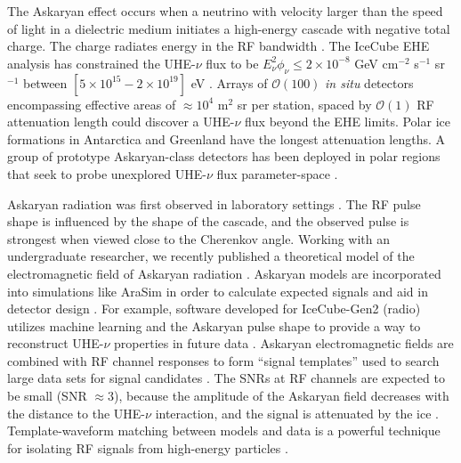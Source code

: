 \documentclass[../../main.tex]{subfiles}
\begin{document}
The Askaryan effect occurs when a neutrino with velocity larger than the speed of light in a dielectric medium initiates a high-energy cascade with negative total charge.  The charge radiates energy in the RF bandwidth \cite{askaryan1,zhs}.  The IceCube EHE analysis has constrained the UHE-$\nu$ flux to be $E_\nu^2 \phi_\nu \leq 2 \times 10^{-8}$ GeV cm$^{-2}$ s$^{-1}$ sr$^{-1}$ between $[5\times 10^{15} - 2\times 10^{19}]$ eV \cite{10.1103/physrevd.98.062003}.  Arrays of $\mathcal{O}(100)$ \textit{in situ} detectors encompassing effective areas of $\approx 10^4$ m$^2$ sr per station, spaced by $\mathcal{O}(1)$ RF attenuation length could discover a UHE-$\nu$ flux beyond the EHE limits.  Polar ice formations in Antarctica and Greenland have the longest attenuation lengths.  A group of prototype Askaryan-class detectors has been deployed in polar regions that seek to probe unexplored UHE-$\nu$ flux parameter-space \cite{rice,10.1088/1475-7516/2020/03/053,10.1103/physrevd.102.043021,10.1103/physrevd.99.122001}. \\ \vspace{2.5mm}

Askaryan radiation was first observed in laboratory settings \cite{saltzberg,10.1103/PhysRevD.74.043002,ask_ice}.  The RF pulse shape is influenced by the shape of the cascade, and the observed pulse is strongest when viewed close to the Cherenkov angle.  Working with an undergraduate researcher, we recently published a theoretical model of the electromagnetic field of Askaryan radiation \cite{PhysRevD.105.123019}. Askaryan models are incorporated into simulations like AraSim in order to calculate expected signals and aid in detector design \cite{dookayka2011characterizing,testbed,10.1140/epjc/s10052-020-7612-8}.  For example, software developed for IceCube-Gen2 (radio) utilizes machine learning and the Askaryan pulse shape to provide a way to reconstruct UHE-$\nu$ properties in future data \cite{10.1140/epjc/s10052-019-6971-5,10.1088/1748-0221/15/09/p09039,IFT}.  Askaryan electromagnetic fields are combined with RF channel responses to form ``signal templates'' used to search large data sets for signal candidates \cite{10.1088/1475-7516/2020/03/053,10.1016/j.astropartphys.2014.09.002}.  The SNRs at RF channels are expected to be small (SNR $\approx 3$), because the amplitude of the Askaryan field decreases with the distance to the UHE-$\nu$ interaction, and the signal is attenuated by the ice \cite{10.3189/2015jog14j214,Barwick:2018497,ALLISON201963}.  Template-waveform matching between models and data is a powerful technique for isolating RF signals from high-energy particles \cite{10.1016/j.astropartphys.2015.04.002,10.1016/j.astropartphys.2014.09.002}. \\ \vspace{2.5mm}
\end{document}
